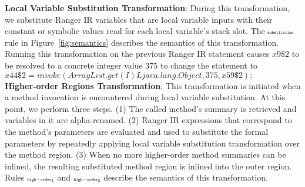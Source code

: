 \textbf{Local Variable Substitution Transformation}: During this transformation, we substitute Ranger IR variables that
are local variable inputs with their constant or symbolic values read for each local variable\rq s stack slot.
%
The $\scriptscriptstyle\mathtt{substitution}$ rule in Figure~\ref{fig:semantics} describes the semantics of this transformation.
%
Running this transformation on the previous Ranger IR statement causes $x9\$2$ to be
resolved to a concrete integer value 375 to change the statement to $x44\$2= invoke(ArrayList.get(I)Ljava.lang.Object,375, x59\$2);$\\
%
\textbf{Higher-order Regions Transformation}: This transformation is initiated when a method invocation is encountered
during local variable substitution.
%
At this point, we perform three steps.
%
(1) The called method\rq s summary is retrieved and variables in it are alpha-renamed.
%
(2) Ranger IR expressions that correspond to the method\rq s parameters are evaluated and used to substitute the formal
parameters by repeatedly applying local variable substitution transformation over the method region.
%
(3) When no more higher-order method summaries can be inlined, the resulting substituted method region is inlined into
the outer region.
%
Rules $\scriptscriptstyle\mathtt{high-order_1}$ and $\scriptscriptstyle\mathtt{high-order_2}$ describe the semantics of this transformation.

